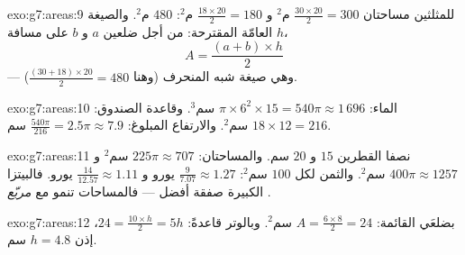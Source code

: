 \begin{solution}{exo:g7:areas:9}
للمثلثين مساحتان $\frac{30 \times 20}{2} = 300$ م$^2$
و $\frac{18 \times 20}{2} = 180$ م$^2$:  $480$ م$^2$. والصيغة
العامّة المقترحة: من أجل ضلعين  $a$ و $b$ على مسافة $h$،
\[
A = \frac{(a + b) \times h}{2}
\]
--- وهي صيغة شبه المنحرف (وهنا $\frac{(30+18)\times 20}{2} = 480$).
\end{solution}

\begin{solution}{exo:g7:areas:10}
 الماء: $\pi \times 6^2 \times 15 = 540\pi \approx 1\,696$
سم$^3$. وقاعدة الصندوق: $18 \times 12 = 216$ سم$^2$. والارتفاع المبلوغ:
$\frac{540\pi}{216} = 2.5\pi \approx 7.9$ سم.
\end{solution}

\begin{solution}{exo:g7:areas:11}
نصفا القطرين $15$ و $20$ سم. والمساحتان: $225\pi \approx 707$ سم$^2$ و
$400\pi \approx 1257$ سم$^2$. والثمن لكل $100$ سم$^2$:
$\frac{9}{7.07} \approx 1.27$ يورو و
$\frac{14}{12.57} \approx 1.11$ يورو. فالبيتزا الكبيرة صفقة
أفضل --- فالمساحات تنمو مع \emph{مربّع} .
\end{solution}

\begin{solution}{exo:g7:areas:12}
بضلعَي القائمة: $A = \frac{6 \times 8}{2} = 24$ سم$^2$. وبالوتر
قاعدةً: $24 = \frac{10 \times h}{2} = 5h$، إذن
$h = 4.8$ سم.
\end{solution}

